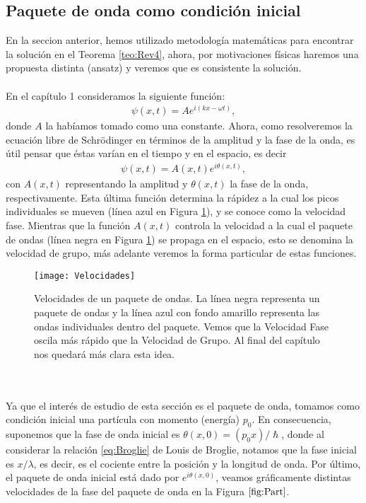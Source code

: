 \documentclass[12pt]{article}
\theoremstyle{definition}
\begin{document}
\subsection{Paquete de onda como condición inicial}
\noindent
En la seccion anterior, hemos utilizado metodología matemáticas para encontrar la solución en el Teorema \ref{teo:Rev4}, ahora, por motivaciones físicas haremos una propuesta distinta (ansatz) y veremos que es consistente la solución.
\\ \\
En el capítulo 1 consideramos la siguiente función:
\begin{align*}
    \psi(x,t) = Ae^{i(kx - \omega t)},
\end{align*}
donde $A$ la habíamos tomado como una constante. Ahora, como resolveremos la ecuación libre de Schrödinger en términos de la amplitud y la fase de la onda, es útil pensar que éstas varían en el tiempo y en el espacio, es decir
\begin{align}
    \psi(x,t) = A(x,t)e^{i\theta(x,t)},
    \label{eq:Apoyo3}
\end{align}
con $A(x,t)$ representando la amplitud  y $\theta(x,t)$ la fase de la onda, respectivamente.
Esta última función determina la rápidez a la cual los picos individuales se mueven (línea azul en Figura \ref{fig:Velocidades}), y se conoce como la velocidad fase. Mientras que la función $A(x,t)$ controla la velocidad a la cual el paquete de ondas (línea negra en Figura \ref{fig:Velocidades}) se propaga en el espacio, esto se denomina la velocidad de grupo, más adelante veremos la forma particular de estas funciones.
\begin{figure}[h]
    \centering
    \texttt{[image: Velocidades]}
    \caption{Velocidades de un paquete de ondas. La línea negra representa un paquete de ondas y la línea azul con fondo amarillo representa las ondas individuales dentro del paquete. Vemos que la Velocidad Fase oscila más rápido que la Velocidad de Grupo. Al final del capítulo nos quedará más clara esta idea.}
    \label{fig:Velocidades}
\end{figure}
\\ \\
Ya que el interés de estudio de esta sección es el paquete de onda, tomamos como condición inicial una partícula con momento (energía) $p_{0}$. En consecuencia, suponemos que la fase de onda inicial es $\theta(x,0) = (p_{0}x)/\hslash$, donde al considerar la relación \eqref{eq:Broglie} de Louis de Broglie, notamos que la fase inicial es $x/\lambda$, es decir, es el cociente entre la posición y la longitud de onda. Por último, el paquete de onda inicial está dado por $e^{i\theta(x,0)}$, veamos gráficamente distintas velocidades de la fase del paquete de onda en la Figura $\ref{fig:Part}$.
\end{document}

